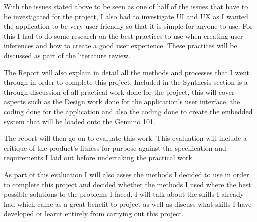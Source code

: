 With the issues stated above to be seen as one of half of the issues that have to be investigated for the project, I also had to investigate UI and UX as I wanted the application to be very user friendly so that it is simple for anyone to use. For this I had to do some research on the best practices to use when creating user inferences and how to create a good user experience. These practices will be discussed as part of the literature review.  

The Report will also explain in detail all the methods and processes that I went through in order to complete this project. Included in the Synthesis section is a through discussion of all practical work done for the project, this will cover aspects such as the Design work done for the application’s user interface, the coding done for the application and also the coding done to create the embedded system that will be loaded onto the Genuino 101. 

The report will then go on to evaluate this work. This evaluation will include a critique of the product’s fitness for purpose against the specification and requirements I laid out before undertaking the practical work. 

As part of this evaluation I will also asses the methods I decided to use in order to complete this project and decided whether the methods I used where the best possible solutions to the problems I faced. I will talk about the skills I already had which came as a great benefit to project as well as discuss what skills I have developed or learnt entirely from carrying out this project.
